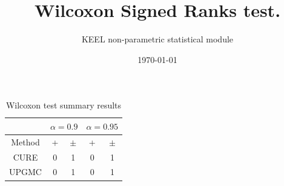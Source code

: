 \documentclass[a4paper,10pt]{article}
\title{Wilcoxon Signed Ranks test.}
\date{\today}
\author{KEEL non-parametric statistical module}
\begin{document}
\pagestyle{empty}
\maketitle
\thispagestyle{empty}


\begin{table}
\centering\scriptsize
{}
\caption{Ranks computed by the Wilcoxon test}

\end{table}

 \clearpage 


\begin{table}
\centering\scriptsize
{}
\caption{Summary of the Wilcoxon test. \textbullet = the method in the row improves the method of the column. \textopenbullet = the method in the column improves the method of the row. Upper diagonal of level significance $\alpha=0.9$,Lower diagonal level of significance $\alpha=0.95$}

\end{table}

 \clearpage 


\begin{table}[!htp]
\centering\scriptsize
\begin{tabular}{
|c|c|c|c|c|}
\hline
&\multicolumn{2}{c|}{$\alpha=0.9$} & \multicolumn{2}{c|}{$\alpha=0.95$}\\\hline
Method & + & $\pm$ & + & $\pm$ \\
\hline
CURE & 0 & 1 & 0 & 1\\
\hline
UPGMC & 0 & 1 & 0 & 1\\
\hline

\end{tabular}
\caption{Wilcoxon test summary results}

\end{table}

 \clearpage 
\end{document}
